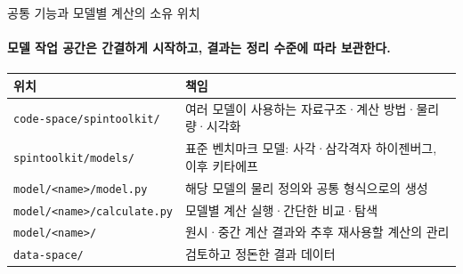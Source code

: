 \begin{frame}[label=model-workspace]{공통 기능과 모델별 계산의 소유 위치}
  \framesubtitle{모델 작업 공간은 간결하게 시작하고, 결과는 정리 수준에 따라 보관한다.}
  \begin{tabularx}{\textwidth}{@{}p{4.8cm}Y@{}}
    \toprule
    위치 & 책임 \\
    \midrule
    \texttt{code-space/spintoolkit/} & 여러 모델이 사용하는 자료구조·계산 방법·물리량·시각화 \\
    \texttt{spintoolkit/models/} & 표준 벤치마크 모델: 사각·삼각격자 하이젠버그, 이후 키타에프 \\
    \texttt{model/<name>/model.py} & 해당 모델의 물리 정의와 공통 형식으로의 생성 \\
    \texttt{model/<name>/calculate.py} & 모델별 계산 실행·간단한 비교·탐색 \\
    \texttt{model/<name>/} & 원시·중간 계산 결과와 추후 재사용할 계산의 관리 \\
    \texttt{data-space/} & 검토하고 정돈한 결과 데이터 \\
    \bottomrule
  \end{tabularx}
  \par\medskip
\end{frame}

